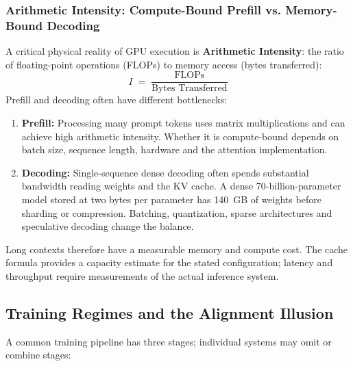 \subsubsection{Arithmetic Intensity: Compute-Bound Prefill vs. Memory-Bound Decoding}
A critical physical reality of GPU execution is \textbf{Arithmetic Intensity}: the ratio of floating-point operations (FLOPs) to memory access (bytes transferred):
\begin{equation}
I \;=\; \frac{\text{FLOPs}}{\text{Bytes Transferred}}
\end{equation}
Prefill and decoding often have different bottlenecks:
\begin{enumerate}[leftmargin=1.8em,itemsep=2pt]
  \item \textbf{Prefill:} Processing many prompt tokens uses matrix multiplications and can achieve high arithmetic intensity. Whether it is compute-bound depends on batch size, sequence length, hardware and the attention implementation.
  \item \textbf{Decoding:} Single-sequence dense decoding often spends substantial bandwidth reading weights and the KV cache. A dense 70-billion-parameter model stored at two bytes per parameter has 140~GB of weights before sharding or compression. Batching, quantization, sparse architectures and speculative decoding change the balance.
\end{enumerate}
Long contexts therefore have a measurable memory and compute cost. The cache formula provides a capacity estimate for the stated configuration; latency and throughput require measurements of the actual inference system.

\subsection{Training Regimes and the Alignment Illusion}

A common training pipeline has three stages; individual systems may omit or combine stages:

